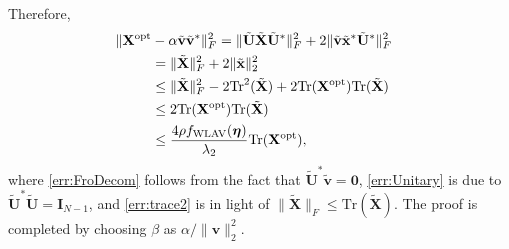 \documentclass[journal,twoside]{IEEEtran}
\newcommand{\Tr}{\mathrm{Tr}}
\newcommand{\bv}{\mathbf{v}}
\newcommand{\bX}{\mathbf{X}}
\newcommand{\tbU}{\tilde{\mathbf{U}}}
\newcommand{\tbX}{\tilde{\mathbf{X}}}
\newcommand{\tbx}{\tilde{\mathbf{x}}}
\newcommand{\tbv}{\tilde{\mathbf{v}}}
\begin{document}
Therefore,
\begin{subequations}
\begin{align}
\hspace{-0.3cm} \|{\bX}^{\mathrm{opt}} &- \alpha\tbv\tbv^{*}\|_F^2
= \|\tbU\tbX\tbU^{*}\|_F^2 + 2 \|\tbv \tbx^{*}\tbU^{*}\|_F^2 \label{err:FroDecom} \\
&= \|\tbX\|_F^2 + 2\|\tbx\|_2^2 \label{err:Unitary} \\
&\leq \|\tbX\|_F^2 - 2\Tr^2(\tbX)+ 2\Tr({\bX}^{\mathrm{opt}})\Tr(\tbX)  \label{err:trace}\\
&\leq 2\Tr({\bX}^{\mathrm{opt}})\Tr(\tbX) \label{err:trace2}\\
&\leq \frac{4\rho f_{\mathrm{WLAV}}(\boldsymbol{\eta}) }{\lambda_2}\Tr({\bX}^{\mathrm{opt}}),\label{err:end}
\end{align}
\end{subequations}
where \eqref{err:FroDecom} follows from the fact that $\tbU^{*}\tbv = \mathbf{0}$, \eqref{err:Unitary} is due to
$\tbU^{*}\tbU = \mathbf{I}_{N-1}$, and \eqref{err:trace2} is in light of $\|\tbX\|_F \leq \Tr(\tbX)$. The proof is completed by choosing $\beta$ as  $\alpha/\|\bv\|^2_2$.
\end{document}
